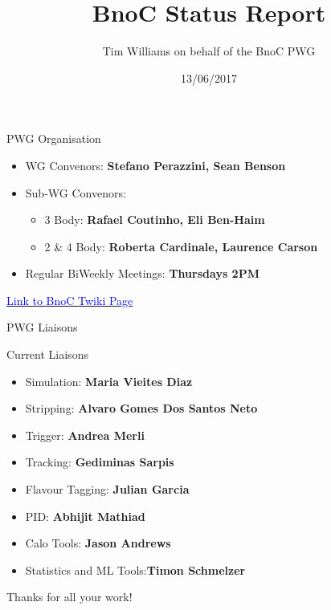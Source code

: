 \documentclass{beamer}
\title[BnoC Status Report]{BnoC Status Report}
\author[Tim Williams]{Tim Williams on behalf of the BnoC PWG}
\institute[Birmingham]{84th \lhcb week}
\date{13/06/2017}
\begin{document}
\begin{frame}
  \titlepage
\end{frame}

\begin{frame}{PWG Organisation}
  \begin{itemize}
  \item WG Convenors: \textbf{Stefano Perazzini, Sean Benson}
  \item Sub-WG Convenors:
    \begin{itemize}
    \item 3 Body: \textbf{Rafael Coutinho, Eli Ben-Haim}
    \item 2 \& 4 Body: \textbf{Roberta Cardinale, Laurence Carson}
    \end{itemize}
  \item Regular BiWeekly Meetings: \textbf{Thursdays 2PM}
  \end{itemize}
  \begin{center}
    \href{https://twiki.cern.ch/twiki/bin/viewauth/LHCbPhysics/BnoCTwikiPage}{\textcolor{blue}{Link to BnoC Twiki Page}}
  \end{center}
\end{frame}

\begin{frame}{PWG Liaisons}
  \begin{exampleblock}{Current Liaisons}
    \begin{itemize}
    \item Simulation: \textbf{Maria Vieites Diaz} \\
    \item Stripping: \textbf{Alvaro Gomes Dos Santos Neto} \\
    \item Trigger: \textbf{Andrea Merli} \\
    \item Tracking: \textbf{Gediminas Sarpis} \\
    \item Flavour Tagging: \textbf{Julian Garcia} \\
    \item PID: \textbf{Abhijit Mathiad} \\
    \item Calo Tools: \textbf{Jason Andrews} \\
    \item Statistics and ML Tools:\textbf{Timon Schmelzer}
    \end{itemize}
  \end{exampleblock}
  \begin{center}
    \LARGE{Thanks for all your work!}
  \end{center}
\end{frame}
\end{document}
